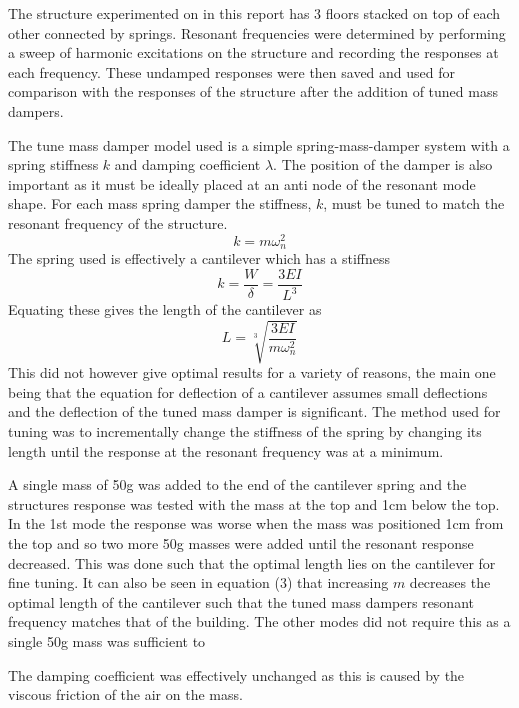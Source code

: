 \documentclass[8pt]{article}
\begin{document}
The structure experimented on in this report has 3 floors stacked on top of each other connected by springs.
Resonant frequencies were determined by performing a sweep of harmonic excitations on the structure and recording the responses at each frequency.
These undamped responses were then saved and used for comparison with the responses of the structure after the addition of tuned mass dampers.

The tune mass damper model used is a simple spring-mass-damper system with a spring stiffness $k$ and damping coefficient $\lambda$.
The position of the damper is also important as it must be ideally placed at an anti node of the resonant mode shape.
For each mass spring damper the stiffness, $k$, must be tuned to match the resonant frequency of the structure.
\begin{equation}
    k = m\omega_n^2
\end{equation}
The spring used is effectively a cantilever which has a stiffness
\begin{equation}
    k = \frac{W}{\delta} = \frac{3EI}{L^3}
\end{equation}
Equating these gives the length of the cantilever as
\begin{equation}
    L = \sqrt[3]{\frac{3EI}{m\omega_n^2}}
\end{equation}
This did not however give optimal results for a variety of reasons, the main one being that the equation for deflection
of a cantilever assumes small deflections and the deflection of the tuned mass damper is significant.
The method used for tuning was to incrementally change the stiffness of the spring by changing its length until the response 
at the resonant frequency was at a minimum. 

A single mass of 50g was added to the end of the cantilever spring and the structures response was tested with the mass at the top and 1cm below the top.
In the 1st mode the response was worse when the mass was positioned 1cm from the top and so two more 50g masses were added until the resonant response decreased.
This was done such that the optimal length lies on the cantilever for fine tuning. It can also be seen in equation (3) that increasing $m$
decreases the optimal length of the cantilever such that the tuned mass dampers resonant frequency matches that of the building.
The other modes did not require this as a single 50g mass was sufficient to 

The damping coefficient was effectively unchanged as this is caused by the viscous friction of the air on the mass.
\end{document}
